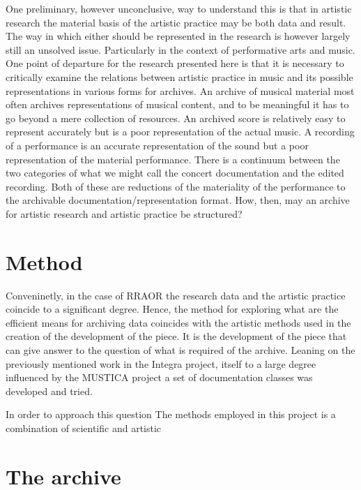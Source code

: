 \documentclass[12pt]{article}
\begin{document}
One preliminary, however unconclusive, way to understand this is that in artistic research the material basis of the artistic practice may be both data and result. The way in which either should be represented in the research is however largely still an unsolved issue. Particularly in the context of performative arts and music. One point of departure for the research presented here is that it is necessary to critically examine the relations between artistic practice in music and its possible representations in various forms for archives. An archive of musical material most often archives representations of musical content, and to be meaningful it has to go beyond a mere collection of resources. An archived score is relatively easy to represent accurately but is a poor representation of the actual music. A recording of a performance is an accurate representation of the sound but a poor representation of the material performance. There is a continuum between the two categories of what we might call the concert documentation and the edited recording. Both of these are reductions of the materiality of the performance to the archivable documentation/representation format. How, then, may an archive for artistic research and artistic practice be structured?

\section{Method}
\label{sec:method}

Conveninetly, in the case of RRAOR the research data and the artistic practice coincide to a significant degree. Hence, the method for exploring what are the efficient means for archiving data coincides with the artistic methods used in the creation of the development of the piece. It is the development of the piece that can give answer to the question of what is required of the archive. Leaning on the previously mentioned work in the Integra project, itself to a large degree influenced by the MUSTICA project  a set of documentation classes was developed and tried.



In order to approach this question 
The methods employed in this project is a combination of scientific and artistic 

\section{The archive}
\label{sec:archive}
\end{document}
